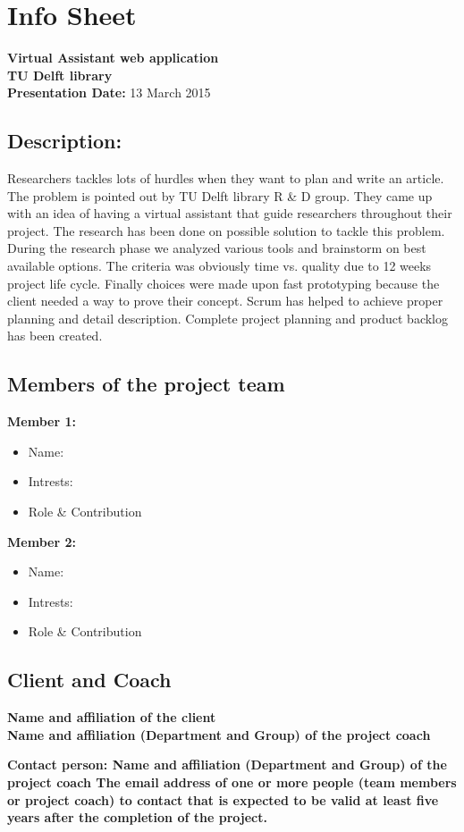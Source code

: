 \chapter{Info Sheet}
    
\textbf{Virtual Assistant web application\\}
\textbf{\small{TU Delft library\\}}
\textbf{Presentation Date: } 13 March 2015\\
\section{Description: }
 Researchers tackles lots of hurdles when they want to plan and write an article. The problem is pointed out by TU Delft library R \& D group. They came up with an idea of having a virtual assistant that guide researchers throughout their project. The research has been done on possible solution to tackle this problem. During the research phase we analyzed various tools and brainstorm on best available options. The criteria was obviously time vs. quality due to 12 weeks project life cycle. Finally choices were made upon fast prototyping because the client needed a way to prove their concept. Scrum has helped to achieve proper planning and detail description. Complete project planning and product backlog has been created. 
 \section{Members of the project team}
\textbf{Member 1: \\}
\begin{itemize}
	\item Name:
	\item Intrests:
	\item Role \& Contribution
\end{itemize}
\textbf{Member 2: \\}
\begin{itemize}
	\item Name:
	\item Intrests:
	\item Role \& Contribution
\end{itemize}

\section{Client and Coach}
\textbf{Name and affiliation of the client
\\ }
\textbf{Name and affiliation (Department and Group) of the project coach\\
}

\textbf{Contact person: Name and affiliation (Department and Group) of the project coach
The email address of one or more people (team members or project coach) to contact that is expected to be valid at least five years after the completion of the project.
}